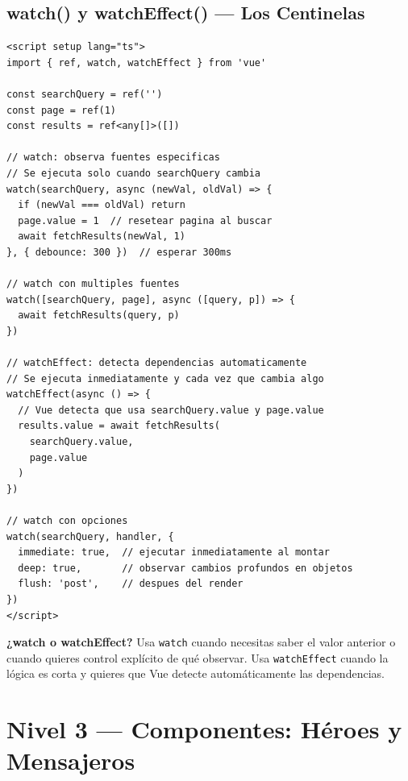 \documentclass[11pt,a4paper]{article}
\begin{document}
\subsection{watch() y watchEffect() — Los Centinelas}

\begin{pergamino}
\begin{lstlisting}[style=vue]
<script setup lang="ts">
import { ref, watch, watchEffect } from 'vue'

const searchQuery = ref('')
const page = ref(1)
const results = ref<any[]>([])

// watch: observa fuentes especificas
// Se ejecuta solo cuando searchQuery cambia
watch(searchQuery, async (newVal, oldVal) => {
  if (newVal === oldVal) return
  page.value = 1  // resetear pagina al buscar
  await fetchResults(newVal, 1)
}, { debounce: 300 })  // esperar 300ms

// watch con multiples fuentes
watch([searchQuery, page], async ([query, p]) => {
  await fetchResults(query, p)
})

// watchEffect: detecta dependencias automaticamente
// Se ejecuta inmediatamente y cada vez que cambia algo
watchEffect(async () => {
  // Vue detecta que usa searchQuery.value y page.value
  results.value = await fetchResults(
    searchQuery.value,
    page.value
  )
})

// watch con opciones
watch(searchQuery, handler, {
  immediate: true,  // ejecutar inmediatamente al montar
  deep: true,       // observar cambios profundos en objetos
  flush: 'post',    // despues del render
})
</script>
\end{lstlisting}
\end{pergamino}

\begin{cofre}
\textbf{¿watch o watchEffect?}
Usa \texttt{watch} cuando necesitas saber el valor anterior o cuando
quieres control explícito de qué observar.
Usa \texttt{watchEffect} cuando la lógica es corta y quieres que
Vue detecte automáticamente las dependencias.
\end{cofre}

\section{Nivel 3 — Componentes: Héroes y Mensajeros}
\end{document}
